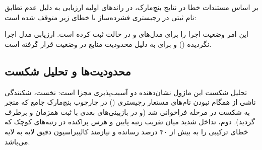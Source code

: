 بر اساس مستندات خطا در نتایج بنچ‌مارک، در راندهای اولیه ارزیابی به دلیل عدم تطابق نام ثبتی در رجیستری فشرده‌ساز با خطای زیر متوقف شده است:
\begin{center}
\small
{}
\end{center}
این امر وضعیت اجرا را برای مدل‌های  و  در حالت  ثبت کرده است. ارزیابی مدل  اجرا نگردیده () و برای  به دلیل محدودیت منابع در وضعیت  قرار گرفته است.

\subsection{محدودیت‌ها و تحلیل شکست}
تحلیل شکست این ماژول نشان‌دهنده دو آسیب‌پذیری مجزا است: نخست، شکنندگی ناشی از همگام نبودن نام‌های مستعار رجیستری () در چارچوب بنچ‌مارک جامع که منجر به شکست در مرحله فراخوانی شد (و در بازبینی‌های بعدی با ثبت همزمان  و  برطرف گردید). دوم، تداخل شدید میان تقریب رتبه پایین و هرس پراکنده در رتبه‌های کوچک که خطای ترکیبی را به بیش از ۴۰ درصد رسانده و نیازمند کالیبراسیون دقیق لایه به لایه می‌باشد.
